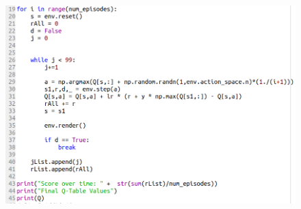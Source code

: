 \begin{figure}[ht]
	\centering
	\includegraphics*[width=15cm,height=20cm,keepaspectratio]{figuras/q_table_2} 
	\label{fig:formula Q-Tables}
\end{figure}

